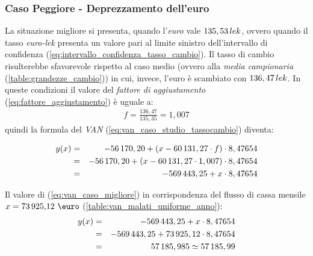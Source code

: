 \subsubsection[Caso Peggiore - Deprezzamento dell'euro]{Caso Peggiore - Deprezzamento dell'euro}
\label{sec:cambio_favorevole}
La situazione migliore si presenta, quando l'\emph{euro} vale $135,53 \thinspace lek$, ovvero quando il tasso \emph{euro-lek} presenta un valore pari al limite sinistro dell'intervallo di confidenza (\ref{eq:intervallo_confidenza_tasso_cambio}). Il tasso di cambio risulterebbe sfavorevole rispetto al caso medio (ovvero alla \textit{media campionaria} (\ref{table:grandezze_cambio})) in cui, invece, l'euro è scambiato con $136,47 \thinspace lek$.\newline
In queste condizioni il valore del \textit{fattore di aggiustamento}  (\ref{eq:fattore_aggiustamento}) è uguale a:
\begin{equation}
\label{eq:fattore_aggiustamento_caso_migliore}
\begin{split}
f = \frac{136,47}{135,35} = 1,007
\end{split}
\end{equation}
quindi la formula del \emph{\ac{VAN}} (\ref{eq:van_caso_studio_tassocambio}) diventa:

\begin{eqnarray}
\label{eq:van_caso_migliore}
 		y(x) & = & -56\thinspace 170,20 + (x - 60\thinspace 131,27 \cdot f) \cdot 8,47654 \nonumber \\
 			 & = & -56\thinspace 170,20 + (x - 60\thinspace 131,27 \cdot 1,007) \cdot 8,47654 \nonumber \\
 			 & = & -569\thinspace 443,25 + x \cdot 8,47654
\end{eqnarray}

Il valore di (\ref{eq:van_caso_migliore}) in corrispondenza del flusso di cassa mensile $ x = \mbox{73\thinspace 925,12 \euro}$ (\ref{table:van_malati_uniforme_anno}):
\begin{eqnarray}
\label{eq:van_flusso_cassa_malati_uniforme_caso_migliore}
 		y(x) & = & -569\thinspace 443,25 + x \cdot 8,47654 \nonumber \\
 			 & = & -569\thinspace 443,25 + 73\thinspace 925,12 \cdot 8,47654 \nonumber \\
 			 & = & 57\thinspace 185,985 \simeq 57\thinspace 185,99
\end{eqnarray}

